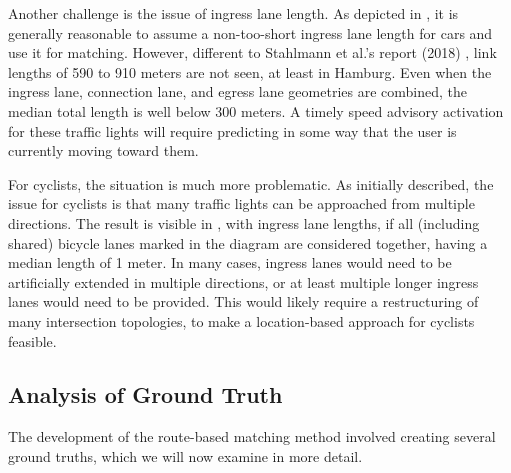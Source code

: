 Another challenge is the issue of ingress lane length. As depicted in , it is generally reasonable to assume a non-too-short ingress lane length for cars and use it for matching. However, different to Stahlmann et al.'s report (2018) \cite{stahlmann_exploring_2018}, link lengths of 590 to 910 meters are not seen, at least in Hamburg. Even when the ingress lane, connection lane, and egress lane geometries are combined, the median total length is well below 300 meters. A timely speed advisory activation for these traffic lights will require predicting in some way that the user is currently moving toward them.

For cyclists, the situation is much more problematic. As initially described, the issue for cyclists is that many traffic lights can be approached from multiple directions. The result is visible in , with ingress lane lengths, if all (including shared) bicycle lanes marked in the diagram are considered together, having a median length of 1 meter. In many cases, ingress lanes would need to be artificially extended in multiple directions, or at least multiple longer ingress lanes would need to be provided. This would likely require a restructuring of many intersection topologies, to make a location-based approach for cyclists feasible.

\subsection{Analysis of Ground Truth}

The development of the route-based matching method involved creating several ground truths, which we will now examine in more detail.

